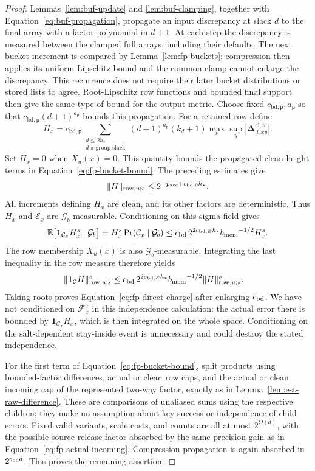 \documentclass[11pt]{article}
\numberwithin{equation}{section}
\theoremstyle{definition}
\theoremstyle{remark}
\begin{document}
\begin{proof}
Lemmas~\ref{lem:buf-update} and \ref{lem:buf-clamping}, together with
Equation~\eqref{eq:buf-propagation}, propagate an input discrepancy at
slack $d$ to the final array with a factor polynomial in $d+1$.
At each step the discrepancy is measured between the clamped full
arrays, including their defaults.  The next bucket increment is
compared by Lemma~\ref{lem:fp-buckets}; compression then applies its
uniform Lipschitz bound and the common clamp cannot enlarge the
discrepancy.  This recurrence does not require their later bucket
distributions or stored lists to agree.
Root-Lipschitz row functions and bounded final support then give the
same type of bound for the output metric.  Choose fixed ${c_{\mathrm{bd},\mathsf{p}}},{a}_{\mathsf{p}}$ so
that ${c_{\mathrm{bd},\mathsf{p}}}(d+1)^{{a}_{\mathsf{p}}}$ bounds this propagation.  For a retained row define
\[
 H_x={c_{\mathrm{bd},\mathsf{p}}}\sum_{\substack{d\le2h_*\\d\text{ a group slack}}}
       (d+1)^{{a}_{\mathsf{p}}}(k_d+1)
       \max_\nu\sup_y|\boldsymbol{\Delta}_{d,xy}^{\mathrm{cl},\nu}|.
\]
Set $H_x=0$ when $X_u(x)=0$.  This quantity bounds the propagated clean-height terms in
Equation~\eqref{eq:fp-bucket-bound}.  The preceding estimates give
\[
                 \|H\|_{\mathrm{row},u;s}\le2^{-{p_{\rm acc}}+{c_{\mathrm{bd},0}}h_*}.
\]
All increments defining $H_x$ are clean, and its other factors are
deterministic.  Thus $H_x$ and $\mathcal E_x$ are
$\mathcal G_b$-measurable.  Conditioning on this sigma-field gives
\[
 \mathbb E\bigl[\mathbf1_{\mathcal C_x}H_x^s\mid\mathcal G_b\bigr]
 =H_x^s\Pr(\mathcal C_x\mid\mathcal G_b)
 \le {c_{\rm bd}}\,2^{2{c_{\mathrm{bd},E}}h_*}{b_{\rm mem}}^{-1/2}H_x^s.
\]
The row membership $X_u(x)$ is also $\mathcal G_b$-measurable.
Integrating the last inequality in the row measure therefore yields
\begin{align*}
 \|\mathbf1_{\mathcal C}H\|_{\mathrm{row},u;s}^s
 &\le {c_{\rm bd}}\,2^{2{c_{\mathrm{bd},E}}h_*}{b_{\rm mem}}^{-1/2}
              \|H\|_{\mathrm{row},u;s}^s.
\end{align*}
Taking roots proves Equation~\eqref{eq:fp-direct-charge} after enlarging
${c_{\rm bd}}$.  We have not conditioned on $\mathcal F_x^c$ in this independence
calculation: the actual error there is bounded by
$\mathbf1_{\mathcal C_x}H_x$, which is then integrated on the whole
space.  Conditioning on the salt-dependent stay-inside event is
unnecessary and could destroy the stated independence.

For the first term of Equation~\eqref{eq:fp-bucket-bound}, split products
using bounded-factor differences, actual or clean row caps, and the
actual or clean incoming cap of the represented two-way factor, exactly
as in Lemma~\ref{lem:est-raw-difference}.  These are comparisons of
unaliased sums using the respective children; they make no assumption
about key success or independence of child errors.  Fixed valid
variants, scale costs, and counts are all at most $2^{O(d)}$, with the
possible source-release factor absorbed by the same precision gain as
in Equation~\eqref{eq:fp-actual-incoming}.  Compression propagation is
again absorbed in $2^{{c_{\rm bd}} d}$.  This proves the remaining assertion.
\end{proof}
\end{document}
